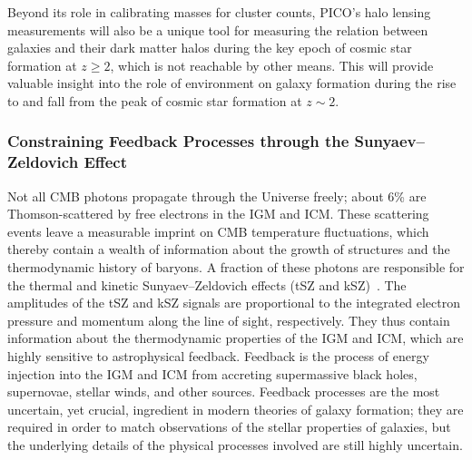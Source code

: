 \documentclass[PICOReport.tex]{subfiles}
\begin{document}
Beyond its role in calibrating masses for cluster counts, PICO's halo lensing measurements will also be a unique tool for measuring the relation between galaxies and their dark matter halos during the key epoch of cosmic star formation at $z\geq 2$, which is not reachable by other means.  This will provide valuable insight into the role of environment on galaxy formation during the rise to and fall from the peak of cosmic star formation at $z\sim 2$. 



\subsubsection{Constraining Feedback Processes through the Sunyaev--Zeldovich Effect}
\label{sec:sz}



Not all CMB photons propagate through the Universe freely; about 6\% are Thomson-scattered by free electrons in the \ac{IGM} and \ac{ICM}.  These scattering events leave a measurable imprint on \ac{CMB} temperature fluctuations, which thereby contain a wealth of information about the growth of structures and the thermodynamic history of baryons. A fraction of these photons are responsible for the thermal and kinetic Sunyaev--Zeldovich effects (tSZ and kSZ)~\citep{zeldovich69,SZ1972}. The amplitudes of the tSZ and kSZ signals are proportional to the integrated electron pressure and momentum along the line of sight, respectively.  They thus contain information about the thermodynamic properties of the \ac{IGM} and \ac{ICM}, which are highly sensitive to astrophysical feedback. Feedback is the process of energy injection into the \ac{IGM} and \ac{ICM} from accreting supermassive black holes, supernovae, stellar winds, and other sources. Feedback processes are the most uncertain, yet crucial, ingredient in modern theories of galaxy formation; they are required in order to match observations of the stellar properties of galaxies, but the underlying details of the physical processes involved are still highly uncertain.
\end{document}
